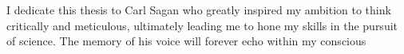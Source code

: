 I dedicate this thesis to Carl Sagan who greatly inspired my ambition to think critically and meticulous, ultimately leading me to hone my skills in the pursuit of science. The memory of his voice will forever echo within my conscious
